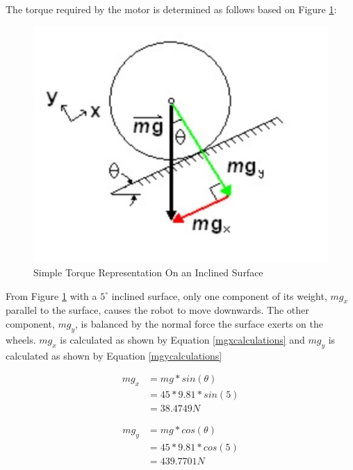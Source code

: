 The torque required by the motor is determined as follows based on Figure \ref{fig:simpletorque}:

\begin{figure}[h]
    \centering
    \includegraphics[scale=0.5]{Figures/simpleTorque.png}
    \caption{Simple Torque Representation On an Inclined Surface}
    \label{fig:simpletorque}
\end{figure}

From Figure \ref{fig:simpletorque} with a $5^{\circ}$ inclined surface, only one component of its weight, $mg_x$ parallel to the surface, causes the robot to move downwards. The other component, $mg_y$, is balanced by the normal force the surface exerts on the wheels. $mg_x$ is calculated as shown by Equation \ref{mgxcalculations} and $mg_y$ is calculated as shown by Equation \ref{mgycalculations}


\begin{equation} \label{mgxcalculations}
\begin{split}
mg_x & = mg * sin (\theta) \\
& = 45 * 9.81 * sin (5) \\
& = 38.4749 N 
\end{split}
\end{equation}

\begin{equation} \label{mgycalculations}
\begin{split}
mg_y & = mg * cos (\theta) \\
& = 45 * 9.81 * cos (5) \\
& = 439.7701 N
\end{split}
\end{equation}


